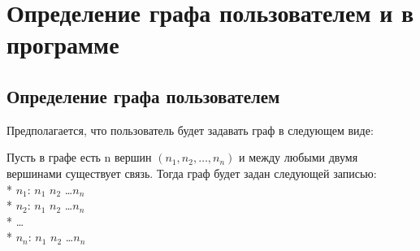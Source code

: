 \documentclass[bachelor, och, pract]{SCWorks}
\begin{document}


\tableofcontents








\section{Определение графа пользователем и в программе}

\subsection{Определение графа пользователем}

Предполагается, что пользователь будет задавать граф в следующем виде:
\bigskip

Пусть в графе есть n вершин $(n_1, n_2, \dots, n_n)$ и между любыми двумя вершинами существует связь.
Тогда граф будет задан следующей записью:\\*
$n_1$: $n_1$ $n_2$ \dots $n_n$\\*
$n_2$: $n_1$ $n_2$ \dots $n_n$\\*
\dots \\*
$n_n$: $n_1$ $n_2$ \dots $n_n$\\
\bigskip
\end{document}
